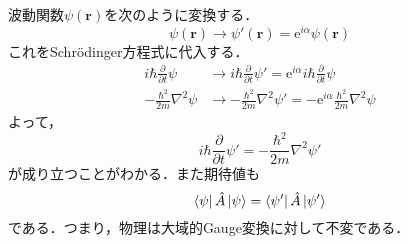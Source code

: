 \documentclass{report}
\begin{document}
  波動関数$\psi(\bm{r})$を次のように変換する．
  \begin{equation}
    \psi(\bm{r})\to\psi'(\bm{r})=\mathrm{e}^{i\alpha}\psi(\bm{r})
  \end{equation}
  これをSchrödinger方程式に代入する．
  \begin{align}
    i\hbar\frac{\partial}{\partial t}\psi&\to i\hbar\frac{\partial}{\partial t}\psi'=\mathrm{e}^{i\alpha}i\hbar\frac{\partial}{\partial t}\psi\\
    -\frac{\hbar^2}{2m}\nabla^2\psi&\to-\frac{\hbar^2}{2m}\nabla^2\psi'=-\mathrm{e}^{i\alpha}\frac{\hbar^2}{2m}\nabla^2\psi
  \end{align}
  よって，
  \begin{equation}
    i\hbar\frac{\partial}{\partial t}\psi'=-\frac{\hbar^2}{2m}\nabla^2\psi'
  \end{equation}
  が成り立つことがわかる．また期待値も
  \begin{equation}
    \bra{\psi}\hat{A}\ket{\psi}=\bra{\psi'}\hat{A}\ket{\psi'}
  \end{equation}
  である．つまり，物理は大域的Gauge変換に対して不変である．
\end{document}
